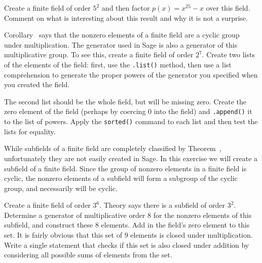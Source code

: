 \begin{sageverbatim}\end{sageverbatim}
%
%
Create a finite field of order $5^2$ and then factor $p(x)=x^{25}-x$ over this field.  Comment on what is interesting about this result and why it is not a surprise.
\begin{sageverbatim}\end{sageverbatim}
%
%
Corollary~ says that the nonzero elements of a finite field are a cyclic group under multiplication.  The generator used in Sage is also a generator of this multiplicative group.  To see this, create a finite field of order $2^7$.  Create two lists of the elements of the field: first, use the \verb?.list()? method, then use a list comprehension to generate the proper powers of the generator you specified when you created the field.\par
%
The second list should be the whole field, but will be missing zero.  Create the zero element of the field (perhaps by coercing 0 into the field) and \verb?.append()? it to the list of powers.  Apply the \verb?sorted()? command to each list and then test the lists for equality.
\begin{sageverbatim}\end{sageverbatim}
%
%
While subfields of a finite field are completely classified by Theorem~, unfortunately they are not easily created in Sage.  In this exercise we will create a subfield of a finite field.  Since the group of nonzero elements in a finite field is cyclic, the nonzero elements of a subfield will form a subgroup of the cyclic group, and necessarily will be cyclic.\par
%
Create a finite field of order $3^6$.  Theory says there is a subfield of order $3^2$.  Determine a generator of multiplicative order 8 for the nonzero elements of this subfield, and construct these 8 elements.  Add in the field's zero element to this set.  It is fairly obvious that this set of 9 elements is closed under multiplication.  Write a single statement that checks if this set is also closed under addition by considering all possible sums of elements from the set.
